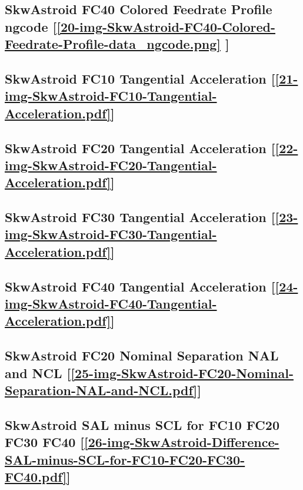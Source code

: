 \subsection       {SkwAstroid FC40 Colored Feedrate Profile ngcode
	[\ref      {20-img-SkwAstroid-FC40-Colored-Feedrate-Profile-data_ngcode.png} ] }
\label{ssec-20-img-SkwAstroid-FC40-Colored-Feedrate-Profile-data_ngcode.png}

\subsection       {SkwAstroid FC10 Tangential Acceleration
	[\ref      {21-img-SkwAstroid-FC10-Tangential-Acceleration.pdf}] }
\label{ssec-21-img-SkwAstroid-FC10-Tangential-Acceleration.pdf}

\subsection       {SkwAstroid FC20 Tangential Acceleration
	[\ref      {22-img-SkwAstroid-FC20-Tangential-Acceleration.pdf}] }
\label{ssec-22-img-SkwAstroid-FC20-Tangential-Acceleration.pdf}

\subsection       {SkwAstroid FC30 Tangential Acceleration
	[\ref      {23-img-SkwAstroid-FC30-Tangential-Acceleration.pdf}] }
\label{ssec-23-img-SkwAstroid-FC30-Tangential-Acceleration.pdf}

\subsection       {SkwAstroid FC40 Tangential Acceleration
	[\ref      {24-img-SkwAstroid-FC40-Tangential-Acceleration.pdf}] }
\label{ssec-24-img-SkwAstroid-FC40-Tangential-Acceleration.pdf}

\subsection       {SkwAstroid FC20 Nominal Separation NAL and NCL
	[\ref      {25-img-SkwAstroid-FC20-Nominal-Separation-NAL-and-NCL.pdf}] }
\label{ssec-25-img-SkwAstroid-FC20-Nominal-Separation-NAL-and-NCL.pdf}

\subsection       {SkwAstroid SAL minus SCL for FC10 FC20 FC30 FC40
	[\ref      {26-img-SkwAstroid-Difference-SAL-minus-SCL-for-FC10-FC20-FC30-FC40.pdf}] }
\label{ssec-26-img-SkwAstroid-Difference-SAL-minus-SCL-for-FC10-FC20-FC30-FC40.pdf}


